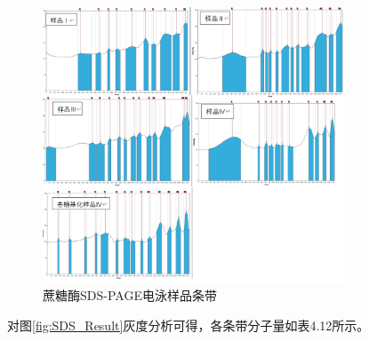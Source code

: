 
\begin{figure}[H]
     \centering
     \label{fig:4.6.1}
     \includegraphics[width = 0.8\textwidth]{figure/Electro/sds 条带.png}
     \caption{蔗糖酶SDS-PAGE电泳样品条带}
\end{figure}

对图\ref{fig:SDS_Result}灰度分析可得，各条带分子量如表4.12所示。

